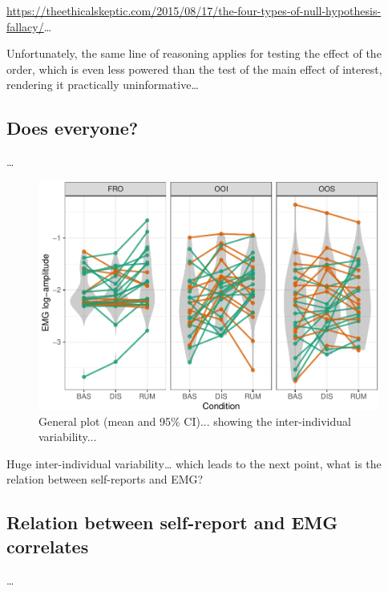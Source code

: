 \documentclass[
  english,
  man,floatsintext]{apa6}
\begin{document}
\url{https://theethicalskeptic.com/2015/08/17/the-four-types-of-null-hypothesis-fallacy/}\ldots{}

Unfortunately, the same line of reasoning applies for testing the effect of the order, which is even less powered than the test of the main effect of interest, rendering it practically uninformative\ldots{}

\hypertarget{does-everyone}{%
\subsection{Does everyone?}\label{does-everyone}}

\ldots{}

\begin{figure}[!htb]

{\centering \includegraphics[width=1\linewidth]{reanalysis_files/figure-latex/everyone-1} 

}

\caption{General plot (mean and 95\% CI)... showing the inter-individual variability...}\label{fig:everyone}
\end{figure}

Huge inter-individual variability\ldots{} which leads to the next point, what is the relation between self-reports and EMG?

\hypertarget{relation-between-self-report-and-emg-correlates}{%
\subsection{Relation between self-report and EMG correlates}\label{relation-between-self-report-and-emg-correlates}}

\ldots{}
\end{document}
